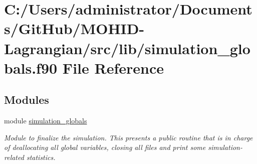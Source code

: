 \hypertarget{simulation__globals_8f90}{}\section{C\+:/\+Users/administrator/\+Documents/\+Git\+Hub/\+M\+O\+H\+I\+D-\/\+Lagrangian/src/lib/simulation\+\_\+globals.f90 File Reference}
\label{simulation__globals_8f90}
\subsection*{Modules}
\begin{DoxyCompactItemize}
\item 
module \mbox{\hyperlink{namespacesimulation__globals}{simulation\+\_\+globals}}
\begin{DoxyCompactList}\small\item\em Module to finalize the simulation. This presents a public routine that is in charge of deallocating all global variables, closing all files and print some simulation-\/related statistics. \end{DoxyCompactList}\end{DoxyCompactItemize}
